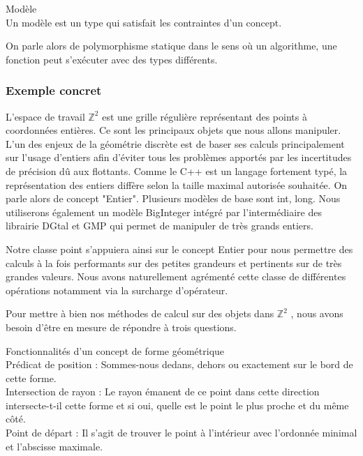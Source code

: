 \begin{Definition}{Modèle}\\
  Un modèle est un type qui satisfait les contraintes d'un concept.
\label{def:cpp-mod}

\end{Definition}

On parle alors de polymorphisme statique dans le sens où un algorithme, une fonction peut s'exécuter avec des types différents.

\subsubsection{Exemple concret}

L'espace de travail $\mathbb{Z}^{2}$ est une grille régulière représentant des points à coordonnées entières. Ce sont les principaux objets que nous allons manipuler. L'un des enjeux de la géométrie discrète est de baser ses calculs principalement sur l'usage d'entiers afin d'éviter tous les problèmes apportés par les incertitudes de précision dû aux flottants. Comme le C++ est un langage fortement typé, la représentation des entiers diffère selon la taille maximal autorisée souhaitée. On parle alors de concept "Entier". Plusieurs modèles de base sont int, long. Nous utiliserons également un modèle BigInteger intégré par l'intermédiaire des librairie DGtal et GMP qui permet de manipuler de très grands entiers.


Notre classe point s’appuiera ainsi sur le concept Entier pour nous permettre des calculs à la fois performants sur des petites grandeurs et pertinents sur de très grandes valeurs. Nous avons naturellement agrémenté cette classe de différentes opérations notamment via la surcharge d'opérateur.


Pour mettre à bien nos méthodes de calcul sur des objets dans $\mathbb{Z}^{2}$ , nous avons besoin d'être en mesure de répondre à trois questions.

\begin{Definition}{ Fonctionnalités d'un concept de forme géométrique}\\
\label{def:cpp-fonc}
   Prédicat de position : Sommes-nous dedans, dehors ou exactement sur le bord de cette forme.\\
   Intersection de rayon : Le rayon émanent de ce point dans cette direction intersecte-t-il cette forme et si oui, quelle est le point le plus proche et du même côté.\\
   Point de départ : Il s'agit de trouver le point à l'intérieur avec l'ordonnée minimal et l'abscisse maximale. 
\end{Definition}

